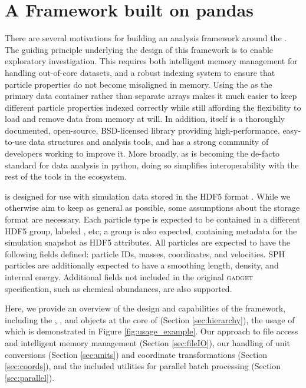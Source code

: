 \section{A Framework built on pandas}
\label{sec:framework}

There are several motivations for building an analysis framework around the . 
The guiding principle underlying the design of this framework is to enable exploratory investigation.
This requires both intelligent memory management for handling out-of-core datasets, and a robust indexing system to ensure that particle properties do not become misaligned in memory.
Using  the  as the primary data container rather than separate  arrays makes it much easier to keep different particle properties indexed correctly while still affording the flexibility to load and remove data from memory at will.
In addition,  itself is a thoroughly documented, open-source, BSD-licensed library providing high-performance, easy-to-use data structures and analysis tools, and has a strong community of developers working to improve it.  
More broadly, as  is becoming the de-facto standard for data analysis in python, doing so simplifies interoperability with the rest of the tools in the ecosystem.

 is designed for use with simulation data stored in the HDF5 format \citep{hdf5}.  
While we otherwise aim to keep  as general as possible, some assumptions about the storage format are necessary.
Each particle type is expected to be contained in a different HDF5 group, labeled , etc; a  group is also expected, containing metadata for the simulation snapshot as HDF5 attributes. 
All particles are expected to have the following fields defined: particle IDs, masses, coordinates, and velocities.  
SPH particles are additionally expected to have a smoothing length, density, and internal energy.  Additional fields not included in the original \textsc{gadget} specification, such as chemical abundances, are also supported.

Here, we provide an overview of the design and capabilities of the  framework, including the , , and  objects at the core of  (Section \ref{sec:hierarchy}), the usage of which is demonstrated in Figure \ref{fig:usage_example}.
Our approach to file access and intelligent memory management (Section \ref{sec:fileIO}), our handling of unit conversions (Section \ref{sec:units}) and coordinate transformations (Section \ref{sec:coords}), and the included utilities for parallel batch processing (Section \ref{sec:parallel}).
